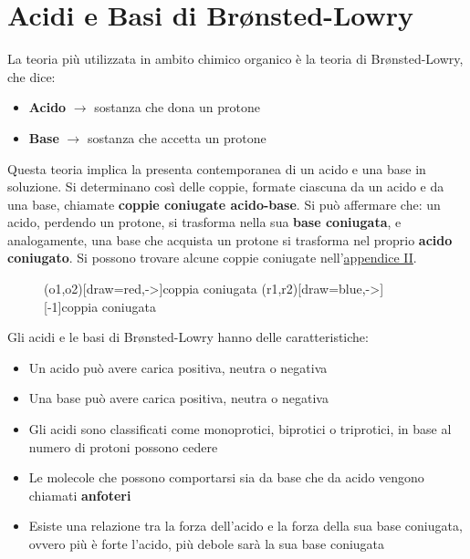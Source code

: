 \section{Acidi e Basi di Br{\o}nsted-Lowry}
La teoria più utilizzata in ambito chimico organico è la teoria di Br{\o}nsted-Lowry, che dice:
\begin{itemize}
	\item[] \textbf{Acido} \(\rightarrow\) sostanza che dona un protone
	\item[] \textbf{Base} \(\rightarrow\) sostanza che accetta un protone
\end{itemize}

Questa teoria implica la presenta contemporanea di un acido e una base in soluzione. Si determinano così delle coppie, formate ciascuna da un acido e da una base, chiamate \textbf{coppie coniugate acido-base}. Si può affermare che: un acido, perdendo un protone, si trasforma nella sua \textbf{base coniugata}, e analogamente, una base che acquista un protone si trasforma nel proprio \textbf{acido coniugato}. Si possono trovare alcune coppie coniugate nell'\hyperref[ap:acidi.basi]{appendice II}.

\begin{figure}[H]
	\centering
	\vspace{7mm}
	\redox(o1,o2)[draw=red,->]{\small \color{red}coppia coniugata}
	\redox(r1,r2)[draw=blue,->][-1]{\small \color{blue}coppia coniugata}
	\vspace{7mm}
\end{figure}

\noindent Gli acidi e le basi di Br{\o}nsted-Lowry hanno delle caratteristiche:
\begin{itemize}
	\item Un acido può avere carica positiva, neutra o negativa
	\item Una base può avere carica positiva, neutra o negativa
	\item Gli acidi sono classificati come monoprotici, biprotici o triprotici, in base al numero di protoni possono cedere
	\item Le molecole che possono comportarsi sia da base che da acido vengono chiamati \textbf{anfoteri}
	\item Esiste una relazione tra la forza dell'acido e la forza della sua base coniugata, ovvero più è forte l'acido, più debole sarà la sua base coniugata
\end{itemize}


